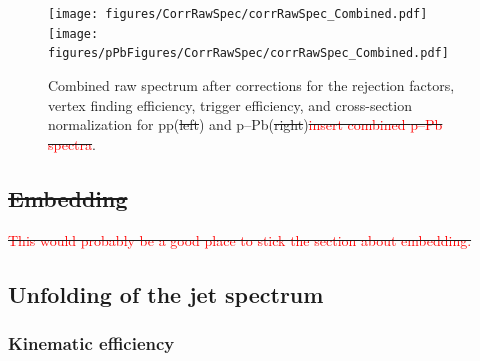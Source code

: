 \documentclass[ALICE]{ALICE_analysis_notes}
\newcommand{\pPb}{{\mbox{p--Pb}}\xspace}
\newcommand{\pp}{pp\xspace}
\providecommand{\DIFaddtex}[1]{{\protect\color{blue}\uwave{#1}}} %
\providecommand{\DIFdeltex}[1]{{\protect\color{red}\sout{#1}}}                      %
\providecommand{\DIFdelbegin}{} %
\providecommand{\DIFdelend}{} %
\providecommand{\DIFaddFL}[1]{\DIFadd{#1}} %
\providecommand{\DIFdelFL}[1]{\DIFdel{#1}} %
\providecommand{\DIFaddbeginFL}{} %
\providecommand{\DIFaddendFL}{} %
\providecommand{\DIFdelbeginFL}{} %
\providecommand{\DIFdelendFL}{} %
\providecommand{\DIFadd}[1]{\texorpdfstring{\DIFaddtex{#1}}{#1}} %
\providecommand{\DIFdel}[1]{\texorpdfstring{\DIFdeltex{#1}}{}} %
\newcommand{\DIFscaledelfig}{0.5}
\newlength{\DIFdelgraphicswidth} %
\newlength{\DIFdelgraphicsheight} %
\newcommand{\DIFaddincludegraphics}[2][]{{\color{blue}\fbox{\DIFOincludegraphics[#1]{#2}}}} %
\newcommand{\DIFdelincludegraphics}[2][]{%
\sbox{\DIFdelgraphicsbox}{\DIFOincludegraphics[#1]{#2}}%
\settoboxwidth{\DIFdelgraphicswidth}{\DIFdelgraphicsbox} %
\settoboxtotalheight{\DIFdelgraphicsheight}{\DIFdelgraphicsbox} %
\scalebox{\DIFscaledelfig}{%
\parbox[b]{\DIFdelgraphicswidth}{\usebox{\DIFdelgraphicsbox}\\[-\baselineskip] \rule{\DIFdelgraphicswidth}{0em}}\llap{\resizebox{\DIFdelgraphicswidth}{\DIFdelgraphicsheight}{%
\setlength{\unitlength}{\DIFdelgraphicswidth}%
\begin{picture}(1,1)%
\thicklines\linethickness{2pt} %
{\color[rgb]{1,0,0}\put(0,0){\framebox(1,1){}}}%
{\color[rgb]{1,0,0}\put(0,0){\line( 1,1){1}}}%
{\color[rgb]{1,0,0}\put(0,1){\line(1,-1){1}}}%
\end{picture}%
}\hspace*{3pt}}} %
} %
\DeclareRobustCommand{\DIFdelbegin}{\DIFOdelbegin \let\includegraphics\DIFdelincludegraphics} %
\DeclareRobustCommand{\DIFdelend}{\DIFOaddend \let\includegraphics\DIFOincludegraphics} %
\DeclareRobustCommand{\DIFaddbeginFL}{\DIFOaddbeginFL \let\includegraphics\DIFaddincludegraphics} %
\DeclareRobustCommand{\DIFaddendFL}{\DIFOaddendFL \let\includegraphics\DIFOincludegraphics} %
\DeclareRobustCommand{\DIFdelbeginFL}{\DIFOdelbeginFL \let\includegraphics\DIFdelincludegraphics} %
\DeclareRobustCommand{\DIFdelendFL}{\DIFOaddendFL \let\includegraphics\DIFOincludegraphics} %
\begin{document}
\begin{figure}
    \centering
    \texttt{[image: figures/CorrRawSpec/corrRawSpec\_Combined.pdf]}
    \DIFaddbeginFL \texttt{[image: figures/pPbFigures/CorrRawSpec/corrRawSpec\_Combined.pdf]}
    \DIFaddendFL \vfill\null
    \caption{Combined raw spectrum after corrections for the rejection factors, vertex finding efficiency, trigger efficiency, and cross-section normalization for \pp (\DIFdelbeginFL \DIFdelFL{left}\DIFdelendFL \DIFaddbeginFL \DIFaddFL{top}\DIFaddendFL ) and \pPb (\DIFdelbeginFL \DIFdelFL{right}\DIFdelendFL \DIFaddbeginFL \DIFaddFL{bottom}\DIFaddendFL )\DIFdelbeginFL \DIFdelFL{\textcolor{red}{insert combined \pPb spectra}}\DIFdelendFL .}
    \label{fig:CombinedRawSpec}
\end{figure}

\DIFdelbegin \subsection{\DIFdel{Embedding}}
\addtocounter{subsection}{-1}%

\DIFdel{\textcolor{red}{This would probably be a good place to stick the section about embedding.}
}%

\DIFdelend \subsection{Unfolding of the jet spectrum}
\label{sec:unfolding}
\subsubsection{Kinematic efficiency}
\label{subsec:kinEff}
\end{document}
